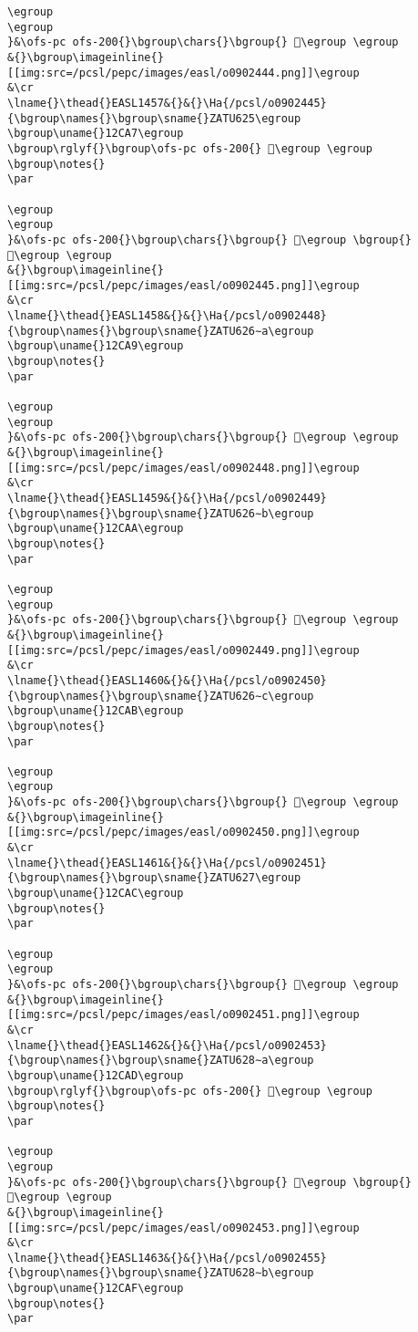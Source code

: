 \begin{verbatim}
\egroup
\egroup
}&\ofs-pc ofs-200{}\bgroup\chars{}\bgroup{} 𒲦\egroup \egroup
&{}\bgroup\imageinline{}[[img:src=/pcsl/pepc/images/easl/o0902444.png]]\egroup
&\cr
\lname{}\thead{}EASL1457&{}&{}\Ha{/pcsl/o0902445}{\bgroup\names{}\bgroup\sname{}ZATU625\egroup
\bgroup\uname{}12CA7\egroup
\bgroup\rglyf{}\bgroup\ofs-pc ofs-200{} 𒲧\egroup \egroup
\bgroup\notes{}
\par 

\egroup
\egroup
}&\ofs-pc ofs-200{}\bgroup\chars{}\bgroup{} 𒲧\egroup \bgroup{} 𒲨\egroup \egroup
&{}\bgroup\imageinline{}[[img:src=/pcsl/pepc/images/easl/o0902445.png]]\egroup
&\cr
\lname{}\thead{}EASL1458&{}&{}\Ha{/pcsl/o0902448}{\bgroup\names{}\bgroup\sname{}ZATU626∼a\egroup
\bgroup\uname{}12CA9\egroup
\bgroup\notes{}
\par 

\egroup
\egroup
}&\ofs-pc ofs-200{}\bgroup\chars{}\bgroup{} 𒲩\egroup \egroup
&{}\bgroup\imageinline{}[[img:src=/pcsl/pepc/images/easl/o0902448.png]]\egroup
&\cr
\lname{}\thead{}EASL1459&{}&{}\Ha{/pcsl/o0902449}{\bgroup\names{}\bgroup\sname{}ZATU626∼b\egroup
\bgroup\uname{}12CAA\egroup
\bgroup\notes{}
\par 

\egroup
\egroup
}&\ofs-pc ofs-200{}\bgroup\chars{}\bgroup{} 𒲪\egroup \egroup
&{}\bgroup\imageinline{}[[img:src=/pcsl/pepc/images/easl/o0902449.png]]\egroup
&\cr
\lname{}\thead{}EASL1460&{}&{}\Ha{/pcsl/o0902450}{\bgroup\names{}\bgroup\sname{}ZATU626∼c\egroup
\bgroup\uname{}12CAB\egroup
\bgroup\notes{}
\par 

\egroup
\egroup
}&\ofs-pc ofs-200{}\bgroup\chars{}\bgroup{} 𒲫\egroup \egroup
&{}\bgroup\imageinline{}[[img:src=/pcsl/pepc/images/easl/o0902450.png]]\egroup
&\cr
\lname{}\thead{}EASL1461&{}&{}\Ha{/pcsl/o0902451}{\bgroup\names{}\bgroup\sname{}ZATU627\egroup
\bgroup\uname{}12CAC\egroup
\bgroup\notes{}
\par 

\egroup
\egroup
}&\ofs-pc ofs-200{}\bgroup\chars{}\bgroup{} 𒲬\egroup \egroup
&{}\bgroup\imageinline{}[[img:src=/pcsl/pepc/images/easl/o0902451.png]]\egroup
&\cr
\lname{}\thead{}EASL1462&{}&{}\Ha{/pcsl/o0902453}{\bgroup\names{}\bgroup\sname{}ZATU628∼a\egroup
\bgroup\uname{}12CAD\egroup
\bgroup\rglyf{}\bgroup\ofs-pc ofs-200{} 𒲭\egroup \egroup
\bgroup\notes{}
\par 

\egroup
\egroup
}&\ofs-pc ofs-200{}\bgroup\chars{}\bgroup{} 𒲭\egroup \bgroup{} 𒲮\egroup \egroup
&{}\bgroup\imageinline{}[[img:src=/pcsl/pepc/images/easl/o0902453.png]]\egroup
&\cr
\lname{}\thead{}EASL1463&{}&{}\Ha{/pcsl/o0902455}{\bgroup\names{}\bgroup\sname{}ZATU628∼b\egroup
\bgroup\uname{}12CAF\egroup
\bgroup\notes{}
\par 


\end{verbatim}
